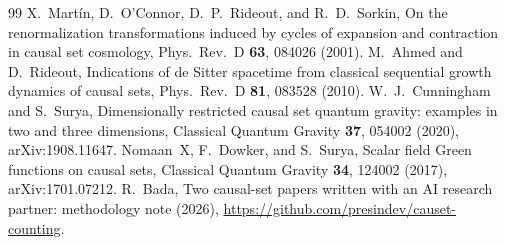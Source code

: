 \documentclass[prd,twocolumn,superscriptaddress,nofootinbib,amsmath,amssymb,floatfix]{revtex4-2}
\begin{document}
\begin{thebibliography}{99}
 X.~Mart\'in, D.~O'Connor, D.~P.~Rideout, and R.~D.~Sorkin, On the renormalization transformations induced by cycles of expansion and contraction in causal set cosmology, Phys.\ Rev.\ D \textbf{63}, 084026 (2001).
 M.~Ahmed and D.~Rideout, Indications of de Sitter spacetime from classical sequential growth dynamics of causal sets, Phys.\ Rev.\ D \textbf{81}, 083528 (2010).
 W.~J.~Cunningham and S.~Surya, Dimensionally restricted causal set quantum gravity: examples in two and three dimensions, Classical Quantum Gravity \textbf{37}, 054002 (2020), arXiv:1908.11647.
 Nomaan~X, F.~Dowker, and S.~Surya, Scalar field Green functions on causal sets, Classical Quantum Gravity \textbf{34}, 124002 (2017), arXiv:1701.07212.
 R.~Bada, Two causal-set papers written with an AI research partner: methodology note (2026), \url{https://github.com/presindev/causet-counting}.
\end{thebibliography}
\end{document}
